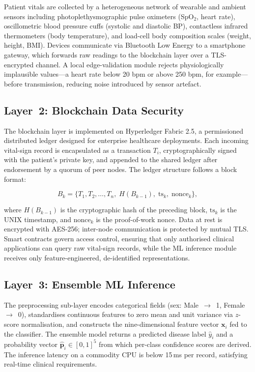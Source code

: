 \documentclass[journal]{IEEEtran}
\begin{document}
Patient vitals are collected by a heterogeneous network of wearable and
ambient sensors including photoplethysmographic pulse oximeters
(SpO$_2$, heart rate), oscillometric blood pressure cuffs (systolic and
diastolic BP), contactless infrared thermometers (body temperature), and
load-cell body composition scales (weight, height, BMI). Devices
communicate via Bluetooth Low Energy to a smartphone gateway, which
forwards raw readings to the blockchain layer over a TLS-encrypted
channel. A local edge-validation module rejects physiologically
implausible values—a heart rate below 20 bpm or above 250 bpm, for
example—before transmission, reducing noise introduced by sensor artefact.

\subsection{Layer~2: Blockchain Data Security}

The blockchain layer is implemented on Hyperledger Fabric 2.5, a
permissioned distributed ledger designed for enterprise healthcare
deployments. Each incoming vital-sign record is encapsulated as a
transaction $T_i$, cryptographically signed with the patient's private key,
and appended to the shared ledger after endorsement by a quorum of peer
nodes. The ledger structure follows a block format:

\begin{equation}
  B_k = \bigl\{T_1, T_2, \ldots, T_n,\; H(B_{k-1}),\; \text{ts}_k,\;
               \text{nonce}_k \bigr\},
  \label{eq:block}
\end{equation}

\noindent where $H(B_{k-1})$ is the cryptographic hash of the preceding
block, $\text{ts}_k$ is the UNIX timestamp, and $\text{nonce}_k$ is the
proof-of-work nonce. Data at rest is encrypted with AES-256; inter-node
communication is protected by mutual TLS. Smart contracts govern access
control, ensuring that only authorised clinical applications can query raw
vital-sign records, while the ML inference module receives only
feature-engineered, de-identified representations.

\subsection{Layer~3: Ensemble ML Inference}
\label{subsec:ml_layer}

The preprocessing sub-layer encodes categorical fields (sex: Male~$\to$~1,
Female~$\to$~0), standardises continuous features to zero mean and unit
variance via $z$-score normalisation, and constructs the nine-dimensional
feature vector $\mathbf{x}_i$ fed to the classifier. The ensemble model
returns a predicted disease label $\hat{y}_i$ and a probability vector
$\hat{\mathbf{p}}_i \in [0,1]^5$ from which per-class confidence scores
are derived. The inference latency on a commodity CPU is below 15\,ms
per record, satisfying real-time clinical requirements.
\end{document}
